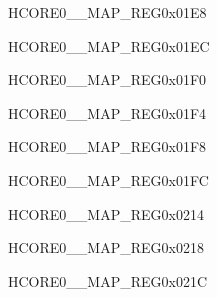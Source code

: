 \begin{register}{H}{CORE0\_\_MAP\_REG}{0x01E8}\label{regdesc:CORE0H264DMA2DINCH2INTMAPREG}
\end{register}\vspace{-3em}


\begin{register}{H}{CORE0\_\_MAP\_REG}{0x01EC}\label{regdesc:CORE0H264DMA2DINCH3INTMAPREG}
\end{register}\vspace{-3em}


\begin{register}{H}{CORE0\_\_MAP\_REG}{0x01F0}\label{regdesc:CORE0H264DMA2DINCH4INTMAPREG}
\end{register}\vspace{-3em}


\begin{register}{H}{CORE0\_\_MAP\_REG}{0x01F4}\label{regdesc:CORE0H264DMA2DINCH5INTMAPREG}
\end{register}\vspace{-3em}


\begin{register}{H}{CORE0\_\_MAP\_REG}{0x01F8}\label{regdesc:CORE0H264REGINTMAPREG}
\end{register}\vspace{-3em}


\begin{register}{H}{CORE0\_\_MAP\_REG}{0x01FC}\label{regdesc:CORE0ASSISTDEBUGINTMAPREG}
\end{register}\vspace{-3em}

\begin{register}{H}{CORE0\_\_MAP\_REG}{0x0214}\label{regdesc:CORE0DMA2DINCH2INTMAPREG}
\end{register}\vspace{-3em}


\begin{register}{H}{CORE0\_\_MAP\_REG}{0x0218}\label{regdesc:CORE0DMA2DOUTCH3INTMAPREG}
\end{register}\vspace{-3em}


\begin{register}{H}{CORE0\_\_MAP\_REG}{0x021C}\label{regdesc:CORE0AXIPERFMONINTMAPREG}
\end{register}\vspace{-3em}

